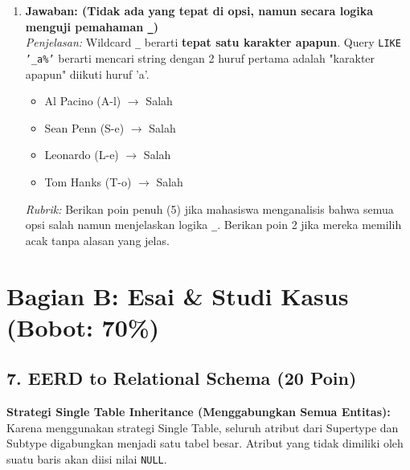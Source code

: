 \documentclass[11pt,a4paper]{article}
\begin{document}
\begin{enumerate}
	\item \textbf{Jawaban: (Tidak ada yang tepat di opsi, namun secara logika menguji pemahaman \texttt{\_})} \\
	      \textit{Penjelasan:} Wildcard \texttt{\_} berarti \textbf{tepat satu karakter apapun}. Query \texttt{LIKE '\_a\%'} berarti mencari string dengan 2 huruf pertama adalah "karakter apapun" diikuti huruf 'a'.
	      \begin{itemize}
		      \item Al Pacino (A-l) $\rightarrow$ Salah
		      \item Sean Penn (S-e) $\rightarrow$ Salah
		      \item Leonardo (L-e) $\rightarrow$ Salah
		      \item Tom Hanks (T-o) $\rightarrow$ Salah
	      \end{itemize}
	      \textit{Rubrik:} Berikan poin penuh (5) jika mahasiswa menganalisis bahwa semua opsi salah namun menjelaskan logika \texttt{\_}. Berikan poin 2 jika mereka memilih acak tanpa alasan yang jelas.
\end{enumerate}

\vspace{1em}
\section*{Bagian B: Esai \& Studi Kasus (Bobot: 70\%)}

\subsection*{7. EERD to Relational Schema (20 Poin)}
\textbf{Strategi Single Table Inheritance (Menggabungkan Semua Entitas):}
Karena menggunakan strategi Single Table, seluruh atribut dari Supertype dan Subtype digabungkan menjadi satu tabel besar. Atribut yang tidak dimiliki oleh suatu baris akan diisi nilai \texttt{NULL}.
\end{document}
